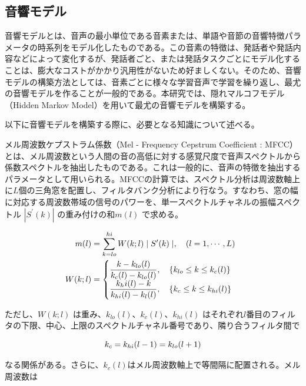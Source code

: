 \subsection{音響モデル}
\label{acoustic_model}
音響モデルとは、音声の最小単位である音素または、単語や音節の音響特徴パラメータの時系列をモデル化したものである。この音素の特徴は、発話者や発話内容などによって変化するが、発話者ごと、または発話タスクごとにモデル化することは、膨大なコストがかかり汎用性がないため好ましくない。そのため、音響モデルの構築方法としては、音素ごとに様々な学習音声で学習を繰り返し、最尤の音響モデルを作ることが一般的である。本研究では、隠れマルコフモデル（Hidden Markov Model）を用いて最尤の音響モデルを構築する。\par
以下に音響モデルを構築する際に、必要となる知識について述べる。\vspace{0.2in}

\par
メル周波数ケプストラム係数（Mel - Frequency Cepstrum Coefficient : MFCC）とは、メル周波数という人間の音の高低に対する感覚尺度で音声スペクトルから係数スペクトルを抽出したものである\cite{sp_recognition_shikano}。これは一般的に、音声の特徴を抽出するパラメータとして用いられる。MFCCの計算では、スペクトル分析は周波数軸上に$L$個の三角窓を配置し、フィルタバンク分析により行なう。すなわち、窓の幅に対応する周波数帯域の信号のパワーを、単一スペクトルチャネルの振幅スペクトル $|S^\prime (k)|$ の重み付けの和$m(l)$ で求める。

\begin{align}
m(l) &=\sum_{k=lo}^{hi}W(k;l)\mid S^\prime(k)\mid, \quad (l=1,\cdots,L) \notag \\
W(k;l) &=\begin{cases}\displaystyle\frac{k-k_{lo}(l)}{k_c(l)-k_{lo}(l)},\quad \{k_{lo}\leq k \leq k_c(l)\} \\ 
\displaystyle\frac{k_hi(l)-k}{k_{hi}(l)-k_{l}(l)},\quad \{k_{c}\leq k \leq k_{hi}(l)\} \end{cases} \notag
\end{align}

ただし、$W(k;l)$ は重み、$k_{lo}(l)、k_c(l)、k_{hi}(l)$ はそれぞれ$l$番目のフィルタの下限、中心、上限のスペクトルチャネル番号であり、隣り合うフィルタ間で

\begin{equation}
k_c=k_{hi}(l-1)=k_{lo}(l+1) \notag
\end{equation}

なる関係がある。さらに、$k_c(l)$はメル周波数軸上で等間隔に配置される。メル周波数は

